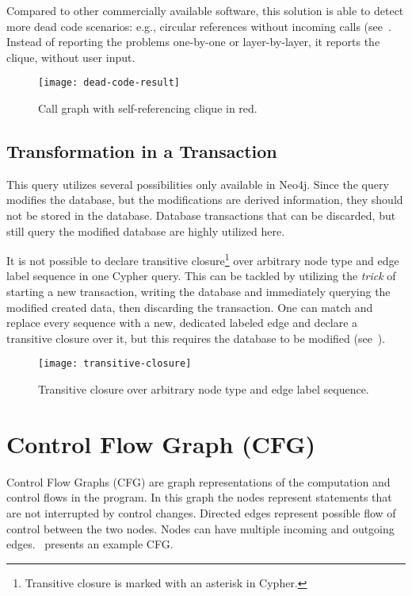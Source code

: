 Compared to other commercially available software, this solution is able to detect more dead code scenarios: e.g., circular references without incoming calls (see~. Instead of reporting the problems one-by-one or layer-by-layer, it reports the clique, without user input.

\begin{figure}[htbp]
  \centering
  \texttt{[image: dead-code-result]}
  \caption{Call graph with self-referencing clique in red.}
  \label{fig:dead-code-result}
\end{figure}

\subsection{Transformation in a Transaction}
This query utilizes several possibilities only available in Neo4j. Since the query modifies the database, but the modifications are derived information, they should not be stored in the database. Database transactions that can be discarded, but still query the modified database are highly utilized here.

It is not possible to declare transitive closure\footnote{Transitive closure is marked with an asterisk in Cypher.} over arbitrary node type and edge label sequence in one Cypher query. This can be tackled by utilizing the \emph{trick} of starting a new transaction, writing the database and immediately querying the modified created data, then discarding the transaction. One can match and replace every sequence with a new, dedicated labeled edge and declare a transitive closure over it, but this requires the database to be modified (see~).

\begin{figure}[htbp]
  \centering
  \texttt{[image: transitive-closure]}
  \caption{Transitive closure over arbitrary node type and edge label sequence.}
  \label{fig:transitive-closure}
\end{figure}


\section{Control Flow Graph (CFG)}
Control Flow Graphs (CFG) are graph representations of the computation and control flows in the program. In this graph the nodes represent statements that are not interrupted by control changes. Directed edges represent possible flow of control between the two nodes. Nodes can have multiple incoming and outgoing edges.~\cite{IntroductionToCompilers}
 presents an example CFG.

